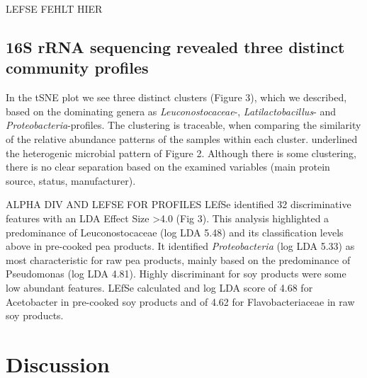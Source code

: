 \documentclass[preprint, 3p,
authoryear]{elsarticle} %
\begin{document}
LEFSE FEHLT HIER

\hypertarget{s-rrna-sequencing-revealed-three-distinct-community-profiles}{%
\subsection{16S rRNA sequencing revealed three distinct community
profiles}\label{s-rrna-sequencing-revealed-three-distinct-community-profiles}}

In the tSNE plot we see three distinct clusters (Figure 3), which we
described, based on the dominating genera as \emph{Leuconostocaceae}-,
\emph{Latilactobacillus}- and \emph{Proteobacteria}-profiles. The
clustering is traceable, when comparing the similarity of the relative
abundance patterns of the samples within each cluster. underlined the
heterogenic microbial pattern of Figure 2. Although there is some
clustering, there is no clear separation based on the examined variables
(main protein source, status, manufacturer).

ALPHA DIV AND LEFSE FOR PROFILES LEfSe identified 32 discriminative
features with an LDA Effect Size \textgreater4.0 (Fig 3). This analysis
highlighted a predominance of Leuconostocaceae (log LDA 5.48) and its
classification levels above in pre-cooked pea products. It identified
\emph{Proteobacteria} (log LDA 5.33) as most characteristic for raw pea
products, mainly based on the predominance of Pseudomonas (log LDA
4.81). Highly discriminant for soy products were some low abundant
features. LEfSe calculated and log LDA score of 4.68 for Acetobacter in
pre-cooked soy products and of 4.62 for Flavobacteriaceae in raw soy
products.

\hypertarget{discussion}{%
\section{Discussion}\label{discussion}}
\end{document}
